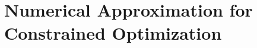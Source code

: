 
\chapter{Numerical Approximation for Constrained Optimization}\label{chapter:ConstrainedNumerical}

